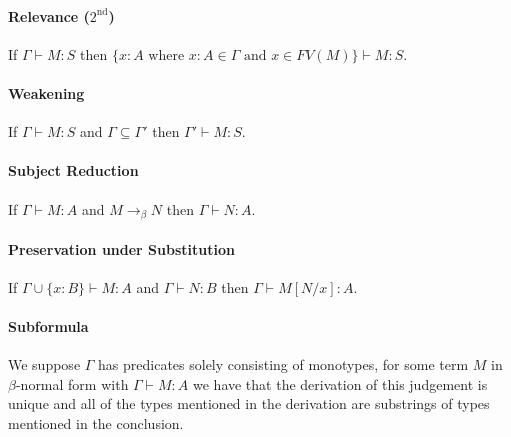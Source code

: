 \paragraph{Relevance ($2^{\text{nd}}$)}
\leavevmode\newline
If $\Gamma \vdash M : S$ then $\{x : A \text{ where }
x : A \in \Gamma \text{ and } x \in FV(M) \} \vdash M : S$.

\paragraph{Weakening}
\leavevmode\newline
If $\Gamma \vdash M : S$ and $\Gamma \subseteq \Gamma'$ then
$\Gamma' \vdash M : S$.

\paragraph{Subject Reduction}
\leavevmode\newline
If $\Gamma \vdash M : A$ and 
$M \to_\beta N$ then $\Gamma \vdash N : A$.

\paragraph{Preservation under Substitution}
\leavevmode\newline
If $\Gamma \cup \{x : B\} \vdash M : A$ and $\Gamma \vdash N : B$
then $\Gamma \vdash M[N / x] : A$.

\paragraph{Subformula}
\leavevmode\newline
We suppose $\Gamma$ has predicates solely consisting of monotypes,
for some term $M$ in $\beta$-normal form with $\Gamma \vdash M : A$
we have that the derivation of this judgement is unique and all
of the types mentioned in the derivation are substrings of types 
mentioned in the conclusion.
